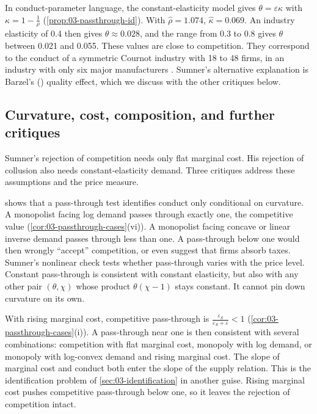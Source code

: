 In conduct-parameter language, the constant-elasticity model gives $\theta = \varepsilon\kappa$ with
$\kappa = 1 - \frac{1}{\rho}$ (\cref{prop:03-passthrough-id}). With $\hat\rho = 1.074$, $\hat\kappa = 0.069$. An
industry elasticity of 0.4 then gives $\theta \approx 0.028$, and the range from 0.3 to 0.8 gives $\theta$ between 0.021
and 0.055. These values are close to competition. They correspond to the conduct of a symmetric Cournot industry with
18 to 48 firms, in an industry with only six major manufacturers \citep[p.~488]{AshenfelterSullivan1987}.
Sumner's alternative explanation is Barzel's (\citeyear{Barzel1976}) quality effect, which we discuss with the other
critiques below.

\subsection{Curvature, cost, composition, and further critiques}\label{sec:03-sumner-critiques}

Sumner's rejection of competition needs only flat marginal cost. His rejection of collusion also needs
constant-elasticity demand. Three critiques address these assumptions and the price measure.

 shows that a pass-through test identifies conduct only conditional on curvature. A
monopolist facing log demand passes through exactly one, the competitive value
(\cref{cor:03-passthrough-cases}(vi)). A monopolist facing concave or linear inverse demand passes through less than
one. A pass-through below one would then wrongly ``accept'' competition, or even suggest that firms absorb taxes.
Sumner's nonlinear check tests whether pass-through varies with the price level. Constant pass-through is consistent
with constant elasticity, but also with any other pair $(\theta, \chi)$ whose product $\theta(\chi - 1)$ stays constant.
It cannot pin down curvature on its own.

With rising marginal cost, competitive pass-through is $\frac{\varepsilon_S}{\varepsilon_S + \varepsilon} < 1$
(\cref{cor:03-passthrough-cases}(i)). A pass-through near one is then consistent with several combinations:
competition with flat marginal cost, monopoly with log demand, or monopoly with log-convex demand and rising marginal
cost. The slope of marginal cost and conduct both enter the slope of the supply relation. This is the identification
problem of \cref{sec:03-identification} in another guise. Rising marginal cost pushes competitive pass-through below
one, so it leaves the rejection of competition intact.

